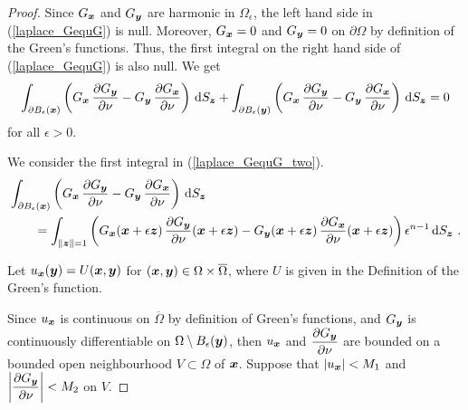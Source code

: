 \begin{proof}
Since $G_{{\bm{x}}}$ and $G_{{\bm{y}}}$ are harmonic in
$\Omega_{\epsilon}$, the left hand 
side in (\ref{laplace_GequG}) is null.  Moreover,
$G_{{\bm{x}}} = 0$ and $G_{{\bm{y}}}=0$ on $\partial \Omega$ by
definition of the Green's functions.  Thus, the first integral on the
right hand side of (\ref{laplace_GequG}) is also null.  We get
\begin{equation} \label{laplace_GequG_two}
\int_{\partial B_{\epsilon}({\bm{x}})}
\left( G_{{\bm{x}}}\,\frac{\partial{G_{{\bm{y}}}}}{\partial \nu} 
- G_{{\bm{y}}}\,\frac{\partial{G_{{\bm{x}}}}}{\partial \nu} \right) \,\mathrm{d}{S}_{{\bm{z}}}
+ \int_{\partial B_{\epsilon}({\bm{y}})}
\left( G_{{\bm{x}}}\,\frac{\partial{G_{{\bm{y}}}}}{\partial \nu} 
- G_{{\bm{y}}}\,\frac{\partial{G_{{\bm{x}}}}}{\partial \nu} \right) \,\mathrm{d}{S}_{{\bm{z}}} = 0
\end{equation}
for all $\epsilon >0$.

We consider the first integral in
(\ref{laplace_GequG_two}).
\begin{equation} \label{laplace_GequG_three}
\begin{split} 
&\int_{\partial B_{\epsilon}({\bm{x}})}
\left( G_{{\bm{x}}}\,\frac{\partial{G_{{\bm{y}}}}}{\partial \nu} 
- G_{{\bm{y}}}\,\frac{\partial{G_{{\bm{x}}}}}{\partial \nu} \right) \,\mathrm{d}{S}_{{\bm{z}}} \\
&\qquad = \int_{\|{\bm{z}}\|=1}
\left( G_{{\bm{x}}}({\bm{x}}+\epsilon {\bm{z}})
\,\frac{\partial{G_{{\bm{y}}}}}{\partial \nu}({\bm{x}}+\epsilon {\bm{z}})
- G_{{\bm{y}}}({\bm{x}}+\epsilon {\bm{z}})
\,\frac{\partial{G_{{\bm{x}}}}}{\partial \nu}({\bm{x}}+\epsilon {\bm{z}}) \right)
\epsilon^{n-1}\,\mathrm{d}{S}_{{\bm{z}}} \ .
\end{split}
\end{equation}

 Let $u_{{\bm{x}}}({\bm{y}}) = U({\bm{x}},{\bm{y}})$ for
$({\bm{x}},{\bm{y}}) \in \Omega \times \overline{\Omega}$, where $U$ is
given in the Definition of the Green's function.

Since $u_{{\bm{x}}}$ is continuous on $\overline{\Omega}$ by definition
of Green's functions, and $G_{{\bm{y}}}$ is continuously differentiable
on $\Omega \setminus B_{\epsilon}({\bm{y}})$, then $u_{{\bm{x}}}$ and
$\displaystyle \frac{\partial{G_{{\bm{y}}}}}{\partial \nu}$ are bounded on a
bounded open neighbourhood $V \subset \Omega$ of ${\bm{x}}$.  Suppose that
$|u_{{\bm{x}}}| < M_1$ and
$\displaystyle \left| \frac{\partial{G_{{\bm{y}}}}}{\partial \nu}\right| < M_2$
on $V$.


\end{proof}
